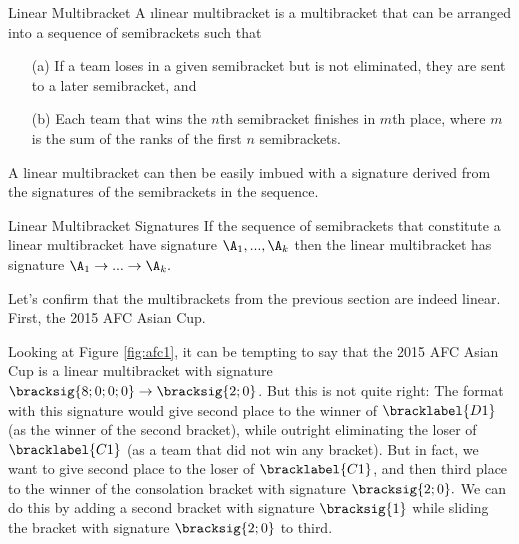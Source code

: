 {    %
   
    \begin{definition}{Linear Multibracket}{}
        A \i{linear multibracket} is a multibracket that can be arranged into a sequence of semibrackets such that
        \begin{enumerate}
            \item[(a)] If a team loses in a given semibracket but is not eliminated, they are sent to a later semibracket, and
            \item[(b)] Each team that wins the $n$th semibracket finishes in $m$th place, where $m$ is the sum of the ranks of the first $n$ semibrackets.
        \end{enumerate}
    \end{definition} %

    A linear multibracket can then be easily imbued with a signature derived from the signatures of the semibrackets in the sequence.

    \begin{definition}{Linear Multibracket Signatures}{}
        If the sequence of semibrackets that constitute a linear multibracket have signature $\A_1, ..., \A_k$ then the linear multibracket has signature $\A_1 \to ... \to \A_k.$
    \end{definition}

    Let's confirm that the multibrackets from the previous section are indeed linear. First, the 2015 AFC Asian Cup.


    Looking at Figure \ref{fig:afc1}, it can be tempting to say that the 2015 AFC Asian Cup is a linear multibracket with signature $\bracksig{8;0;0;0} \to \bracksig{2;0}$. But this is not quite right: The format with this signature would give second place to the winner of $\bracklabel{D1}$ (as the winner of the second bracket), while outright eliminating the loser of $\bracklabel{C1}$ (as a team that did not win any bracket). But in fact, we want to give second place to the loser of $\bracklabel{C1}$, and then third place to the winner of the consolation bracket with signature $\bracksig{2;0}.$ We can do this by adding a second bracket with signature $\bracksig{1}$ while sliding the bracket with signature $\bracksig{2;0}$ to third.

}

